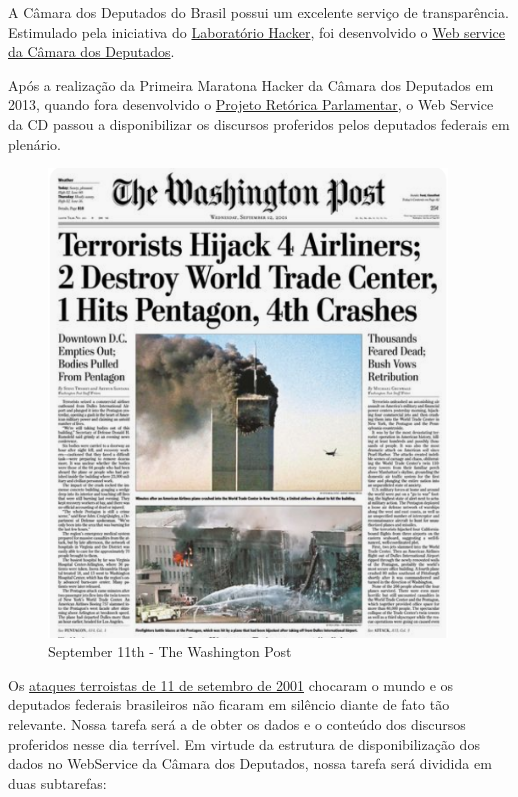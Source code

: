 \documentclass[]{book}
\begin{document}
A Câmara dos Deputados do Brasil possui um excelente serviço de transparência.
Estimulado pela iniciativa do \href{http://labhackercd.leg.br/}{Laboratório Hacker}, foi desenvolvido
o \href{http://www2.camara.leg.br/transparencia/dados-abertos/dados-abertos-legislativo/webservices}{Web service da Câmara dos Deputados}.

Após a realização da Primeira Maratona Hacker da Câmara dos Deputados em 2013, quando fora
desenvolvido o \href{http://retorica.labhackercd.leg.br/}{Projeto Retórica Parlamentar}, o Web Service
da CD passou a disponibilizar os discursos proferidos pelos deputados federais em plenário.

\begin{figure}
\centering
\includegraphics[width=4.16667in,height=\textheight]{images/september-11th.png}
\caption{September 11th - The Washington Post}
\end{figure}

Os \href{https://pt.wikipedia.org/wiki/Ataques_de_11_de_setembro_de_2001}{ataques terroistas de 11 de setembro de 2001}
chocaram o mundo e os deputados federais brasileiros não ficaram em silêncio diante de
fato tão relevante. Nossa tarefa será a de obter os dados e o conteúdo dos discursos proferidos nesse dia terrível.
Em virtude da estrutura de disponibilização dos dados no WebService da Câmara dos Deputados, nossa tarefa será dividida em duas subtarefas:
\end{document}
